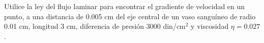 \item Utilice la ley del flujo laminar para encontrar el gradiente de velocidad en un punto, a una distancia de 0.005 cm del eje central de un vaso sanguíneo de radio 0.01 cm, longitud 3 cm, diferencia de presión 3000 din/cm$^2$ y viscosidad $\eta = 0.027$.
